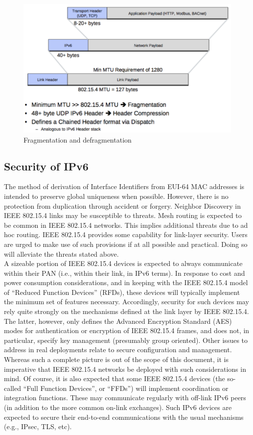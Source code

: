 \begin{figure}[ht]
	\centering
	\includegraphics[scale=0.51]{images/headercompression.png}
	\caption{Fragmentation and defragmentation}
\end{figure}
\subsection{Security of IPv6}
The method of derivation of Interface Identifiers from EUI-64 MAC addresses is intended to preserve global uniqueness when possible. However, there is no protection from duplication through accident or forgery. Neighbor Discovery in IEEE 802.15.4 links may be susceptible to threats.  Mesh routing is expected to be common in IEEE 802.15.4 networks. This implies additional threats due to ad hoc routing.  IEEE 802.15.4 provides some capability for link-layer security. Users are urged to make use of such provisions if at all possible and practical.  Doing so will alleviate the threats stated above. \\A sizeable portion of IEEE 802.15.4 devices is expected to always communicate within their PAN (i.e., within their link, in IPv6 terms).  In response to cost and power consumption considerations, and in keeping with the IEEE 802.15.4 model of ``Reduced Function Devices'' (RFDs), these devices will typically implement the minimum set of features necessary.  Accordingly, security for such devices may rely quite strongly on the mechanisms defined at the link layer by IEEE 802.15.4.  The latter, however, only defines the Advanced Encryption Standard (AES) modes for authentication or encryption of IEEE 802.15.4 frames, and does not, in particular, specify key management (presumably group oriented).  Other issues to address in real deployments relate to secure configuration and management. Whereas such a complete picture is out of the scope of this document, it is imperative that IEEE 802.15.4 networks be deployed with such  considerations in mind.  Of course, it is also expected that some IEEE 802.15.4 devices (the so-called ``Full Function Devices'', or ``FFDs'') will implement coordination or integration functions.  These may communicate regularly with off-link IPv6 peers (in addition to the more common on-link exchanges).  Such IPv6 devices are expected to secure their end-to-end communications with the usual mechanisms (e.g., IPsec, TLS, etc).
